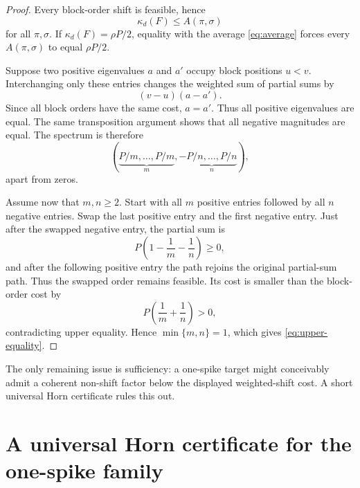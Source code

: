 \documentclass[11pt]{article}
\theoremstyle{definition}
\theoremstyle{remark}
\newcommand{\1}{\mathbf 1}
\begin{document}
\begin{proof}
Every block-order shift is feasible, hence
\[
 \kappa_d(F)\le A(\pi,\sigma)
\]
for all $\pi,\sigma$.  If $\kappa_d(F)=\rho P/2$, equality with the average \eqref{eq:average} forces every $A(\pi,\sigma)$ to equal $\rho P/2$.

Suppose two positive eigenvalues $a$ and $a'$ occupy block positions $u<v$.  Interchanging only these entries changes the weighted sum of partial sums by
\[
 (v-u)(a-a').
\]
Since all block orders have the same cost, $a=a'$.  Thus all positive eigenvalues are equal.  The same transposition argument shows that all negative magnitudes are equal.  The spectrum is therefore
\begin{equation}
 \left(\underbrace{P/m,\ldots,P/m}_{m},
 -\underbrace{P/n,\ldots,P/n}_{n}\right),
 \label{eq:flat-blocks}
\end{equation}
apart from zeros.

Assume now that $m,n\ge2$.  Start with all $m$ positive entries followed by all $n$ negative entries.  Swap the last positive entry and the first negative entry.  Just after the swapped negative entry, the partial sum is
\[
 P\left(1-\frac1m-\frac1n\right)\ge0,
\]
and after the following positive entry the path rejoins the original partial-sum path.  Thus the swapped order remains feasible.  Its cost is smaller than the block-order cost by
\[
 P\left(\frac1m+\frac1n\right)>0,
\]
contradicting upper equality.  Hence $\min\{m,n\}=1$, which gives \eqref{eq:upper-equality}.
\end{proof}

The only remaining issue is sufficiency: a one-spike target might conceivably admit a coherent non-shift factor below the displayed weighted-shift cost.  A short universal Horn certificate rules this out.

\section{A universal Horn certificate for the one-spike family}
\label{sec:Horn}
\end{document}
